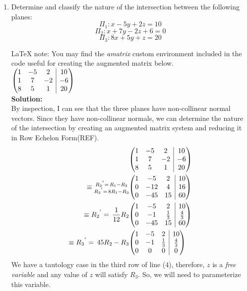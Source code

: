 \documentclass[12pt]{book}
\makeatletter
\newenvironment{amatrix}[1]{%
  \left(\begin{array}{@{}*{#1}{c}|c@{}}
}{%
  \end{array}\right)
}
\makeatother
\begin{document}
\begin{enumerate}
\newpage

\item Determine and classify the nature of the intersection between the following planes:
$$\Pi_1: x-5y+2z=10 $$
$$\Pi_2: x+7y-2z+6=0 $$
$$\Pi_3: 8x+5y+z=20 $$


\LaTeX{} note: You may find the \emph{amatrix} custom environment included in the code useful for creating the augmented matrix below.\\

$
\begin{amatrix}{3}
   1 & -5 & 2 & 10\\  1 & 7 & -2  & -6\\ 8 & 5 & 1 & 20 
 \end{amatrix}
$\\


\textbf{Solution:}\\
By inspection, I can see that the three planes have non-collinear normal vectors. Since they have non-collinear normals, we can determine the nature of the intersection by creating an augmented matrix system and reducing it in Row Echelon Form(REF).
\setcounter{equation}{0}
\begingroup
\addtolength{\jot}{0.5em}
\begin{align}
    &\begin{amatrix}{3}
        1 & -5 & 2 & 10\\
        1 & 7 & -2  & -6\\
        8 & 5 & 1 & 20 
    \end{amatrix}\\
    \equiv
    \substack{{R_2}^{'} =\, R_1-R_2 \\
    {R_3}^{'} =\, 8R_1-R_3}
    &\begin{amatrix}{3}
       1 & -5 & 2 & 10\\
       0 & -12 & 4  & 16\\
       0 & -45 & 15 & 60 
    \end{amatrix}\\
    \equiv
    {R_2}^{'} =\, \dfrac{1}{12}R_2
    &\begin{amatrix}{3}
       1 & -5 & 2 & 10\\
       0 & -1 & \frac{1}{3}  & \frac{4}{3}\\
       0 & -45 & 15 & 60 
    \end{amatrix}\\
    \equiv
    {R_3}^{'} =\, 45R_2-R_3
    &\begin{amatrix}{3}
       1 & -5 & 2 & 10\\
       0 & -1 & \frac{1}{3}  & \frac{4}{3}\\
       0 & 0 & 0 & 0
    \end{amatrix}
\end{align}
\endgroup
We have a tautology case in the third row of line (4), therefore, $z$ is a \textit{free variable} and any value of $z$ will satisfy $R_3$. So, we will need to parameterize this variable.


\end{enumerate}
\end{document}
